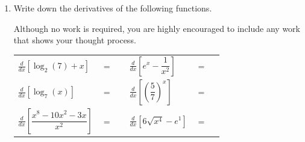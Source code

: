 \documentclass[11pt]{article}
\begin{document}
\begin{enumerate}
\newpage


\item Write down the derivatives of the following functions. 

Although no work is required, you are highly encouraged to include any work that shows your thought process. 

\begin{center}
        \begin{tabular}{l c r l c r}
            $\displaystyle\frac{d}{dx}\left[ \log_{2}(7) + x\right]$ & $=$ & \rule[-8pt]{1.5in}{0.4pt} &
            \vspace{3cm} 

            $\displaystyle\frac{d}{dx}\left[ e^x-\dfrac{1}{x^2} \right]$ & $=$ & \rule[-8pt]{1.5in}{0.4pt}\\[1in]
            \vspace{3cm} 

            $\displaystyle\frac{d}{dx}\left[ \log_7(x) \right]$ & $=$ & \rule[-8pt]{1.5in}{0.4pt}&
            $\displaystyle\frac{d}{dx}\left[ \left(\dfrac{5}{7}\right)^x \right]$ & $=$ & \rule[-8pt]{1.5in}{0.4pt}\\[1in]
            \vspace{3cm} 

            $\displaystyle\frac{d}{dx}\left[ \dfrac{x^8-10x^2 - 3x}{x^2} \right]$ & $=$ & \rule[-8pt]{1.5in}{0.4pt} & 
            $\displaystyle\frac{d}{dx}\left[ 6\sqrt{x^4}-e^1 \right]$ & $=$ & \rule[-8pt]{1.5in}{0.4pt}\\[0.3in]
        \end{tabular}
        
\end{center}


\newpage


\end{enumerate}
\end{document}

